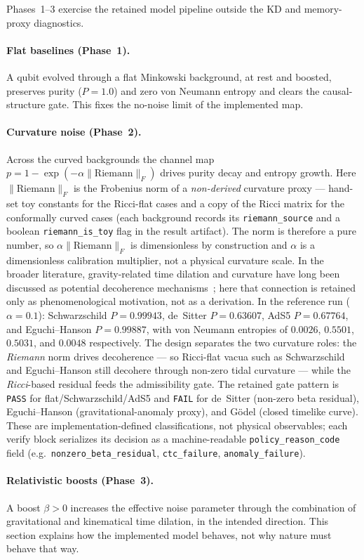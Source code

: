 Phases~1--3 exercise the retained model pipeline outside the KD and memory-proxy
diagnostics.

\paragraph{Flat baselines (Phase~1).} A qubit evolved through a flat Minkowski
background, at rest and boosted, preserves purity ($P=1.0$) and zero von Neumann entropy
and clears the causal-structure gate. This fixes the no-noise limit of the implemented
map.

\paragraph{Curvature noise (Phase~2).} Across the curved backgrounds the channel map
$p = 1-\exp(-\alpha\lVert \mathrm{Riemann}\rVert_F)$ drives purity decay and entropy
growth. Here $\lVert \mathrm{Riemann}\rVert_F$ is the Frobenius norm of a \emph{non-derived}
curvature proxy --- hand-set toy constants for the Ricci-flat cases and a copy of the Ricci
matrix for the conformally curved cases (each background records its \texttt{riemann\_source}
and a boolean \texttt{riemann\_is\_toy} flag in the result artifact). The norm is therefore a
pure number, so $\alpha\lVert \mathrm{Riemann}\rVert_F$ is dimensionless by construction and
$\alpha$ is a dimensionless calibration multiplier, not a physical curvature scale. In the
broader literature, gravity-related time dilation and curvature have long been discussed as
potential decoherence mechanisms~\cite{Pikovski2015}; here that connection is retained only
as phenomenological motivation, not as a derivation.
In the
reference run ($\alpha=0.1$): Schwarzschild $P=0.99943$, de~Sitter
$P=0.63607$, AdS5 $P=0.67764$, and Eguchi--Hanson $P=0.99887$, with von Neumann entropies
of $0.0026$, $0.5501$, $0.5031$, and $0.0048$ respectively. The design separates the two
curvature roles: the \emph{Riemann} norm drives decoherence --- so Ricci-flat vacua such
as Schwarzschild and Eguchi--Hanson still decohere through non-zero tidal curvature ---
while the \emph{Ricci}-based residual feeds the admissibility gate. The retained gate
pattern is \texttt{PASS} for flat/Schwarzschild/AdS5 and \texttt{FAIL} for de~Sitter
(non-zero beta residual), Eguchi--Hanson (gravitational-anomaly proxy), and G\"odel
(closed timelike curve). These are implementation-defined classifications, not physical
observables; each verify block serializes its decision as a machine-readable
\texttt{policy\_reason\_code} field (e.g.\ \texttt{nonzero\_beta\_residual},
\texttt{ctc\_failure}, \texttt{anomaly\_failure}).

\paragraph{Relativistic boosts (Phase~3).} A boost $\beta>0$ increases the effective
noise parameter through the combination of gravitational and kinematical time dilation,
in the intended direction. This section explains how the implemented model behaves, not
why nature must behave that way.
